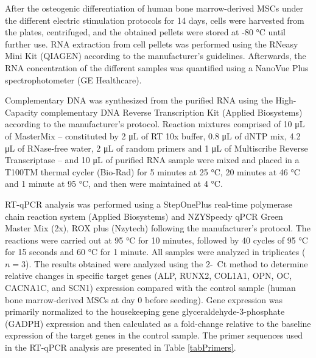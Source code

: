 After the osteogenic differentiation of human bone marrow-derived \ac{MSCs} under the different electric stimulation protocols for 14 days, cells were harvested from the plates, centrifuged, and the obtained pellets were stored at -80 \si{\celsius} until further use. \ac{RNA} extraction from cell pellets was performed using the RNeasy Mini Kit (QIAGEN) according to the manufacturer’s guidelines. Afterwards, the \ac{RNA} concentration of the different samples was quantified using a NanoVue Plus spectrophotometer (GE Healthcare).  

Complementary \ac{DNA} was synthesized from the purified \ac{RNA} using the High-Capacity complementary \ac{DNA} Reverse Transcription Kit (Applied Biosystems) according to the manufacturer’s protocol. Reaction mixtures comprised of 10 \si{\micro\liter} of MasterMix – constituted by 2 \si{\micro\liter} of RT 10x buffer, 0.8 \si{\micro\liter} of dNTP mix, 4.2 \si{\micro\liter} of RNase-free water, 2 \si{\micro\liter} of random primers and 1 \si{\micro\liter} of Multiscribe Reverse Transcriptase – and 10 \si{\micro\liter} of purified \ac{RNA} sample were mixed and placed in a T100TM thermal cycler (Bio-Rad) for 5 minutes at 25 \si{\celsius}, 20 minutes at 46 \si{\celsius} and 1 minute at 95 \si{\celsius}, and then were maintained at 4 \si{\celsius}.  

\acs{RT-qPCR} analysis was performed using a StepOnePlus real-time polymerase chain reaction system (Applied Biosystems) and NZYSpeedy qPCR Green Master Mix (2x), ROX plus (Nzytech) following the manufacturer’s protocol. The reactions were carried out at 95 \si{\celsius} for 10 minutes, followed by 40 cycles of 95 \si{\celsius} for 15 seconds and 60 \si{\celsius} for 1 minute. All samples were analyzed in triplicates ($n=3$). The results obtained were analyzed using the 2-\si{\Delta\Delta}Ct method to determine relative changes in specific target genes (ALP, RUNX2, COL1A1, OPN, OC, CACNA1C, and SCN1\si{\alpha}) expression compared with the control sample (human bone marrow-derived \ac{MSCs} at day 0 before seeding). Gene expression was primarily normalized to the housekeeping gene glyceraldehyde-3-phosphate (GADPH) expression and then calculated as a fold-change relative to the baseline expression of the target genes in the control sample. The primer sequences used in the \ac{RT-qPCR} analysis are presented in Table \ref{tabPrimers}.


